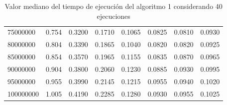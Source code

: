 \documentclass{report}
\begin{document}
\begin{appendices}
\begin{table}[H]
\begin{tabular}{lrrrrrrr}
75000000  &       0.754 &  0.3200 &  0.1710 &  0.1065 &  0.0825 &  0.0810 &  0.0930 \\
80000000  &       0.804 &  0.3390 &  0.1865 &  0.1040 &  0.0820 &  0.0820 &  0.0925 \\
85000000  &       0.854 &  0.3570 &  0.1965 &  0.1155 &  0.0835 &  0.0870 &  0.0965 \\
90000000  &       0.904 &  0.3800 &  0.2060 &  0.1230 &  0.0885 &  0.0930 &  0.0995 \\
95000000  &       0.955 &  0.3990 &  0.2145 &  0.1215 &  0.0955 &  0.0940 &  0.1020 \\
100000000 &       1.005 &  0.4190 &  0.2285 &  0.1280 &  0.0930 &  0.0955 &  0.1025 \\
\bottomrule
\end{tabular}
\caption{Valor mediano del tiempo de ejecución del algoritmo 1
  considerando 40 ejecuciones}
\label{table:squares-alg1-data}
\end{table}


\end{appendices}
\end{document}

